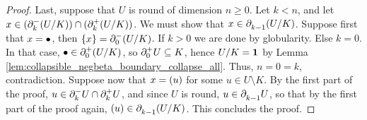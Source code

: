 \begin{proof}
    Last, suppose that \( U \) is round of dimension \( n \geq 0 \).
    Let \( k < n \), and let \( x \in (\bd{k}{-} (\coll{K}{U})) \cap (\bd{k}{+} (\coll{K}{U})) \).
    We must show that \( x \in \bd{k - 1}{}  (\coll{K}{U}) \).
    Suppose first that \( x = \zcoll \), then \( \set{x} = \bd{0}{-} (\coll{K}{U}) \).
    If \( k > 0 \) we are done by globularity.
    Else \( k = 0 \).
    In that case, \( \zcoll \in \bd{0}{+} (\coll{K}{U}) \), so \( \bd{0}{+} U \subseteq K \), hence \( \coll{K}{U} = \pt \) by Lemma \ref{lem:collapsible_negbeta_boundary_collapse_all}.
    Thus, \( n = 0 = k \), contradiction.
    Suppose now that \( x = \icoll{u} \) for some \( u \in U \setminus K \).
    By the first part of the proof, \( u \in \bd{k}{-} U \cap \bd{k}{+} U \), and since \( U \) is round, \( u \in \bd{k - 1}{} U \), so that by the first part of the proof again, \( \icoll{u} \in \bd{k - 1}{} (\coll{K}{U}) \).
    This concludes the proof.
\end{proof}

